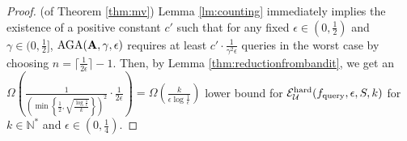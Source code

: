 \begin{proof}(of Theorem \ref{thm:mv})
Lemma \ref{lm:counting} immediately implies the existence of a positive constant $c'$ such that for any fixed $\epsilon\in(0,\frac{1}{2})$ and $\gamma\in(0,\frac{1}{2}]$, ${\mathrm{AGA}}(\mathbf A, \gamma,\epsilon)$ requires at least $c'\cdot\frac{1}{\gamma^2\epsilon}$ queries in the worst case by choosing $n=\lceil\frac{1}{2\epsilon}\rceil-1$. Then, by Lemma \ref{thm:reductionfrombandit}, we get an $\Omega(\frac{1}{
\left(\min\left\{\frac{1}{2},\sqrt{\frac{
	\log\frac{1}{\epsilon}
}{k}}\right\}\right)^2
}\cdot\frac{1}{2\epsilon})=\Omega(\frac{k}{\epsilon\log\frac{1}{\epsilon}})$ lower bound for $\mathcal{E}^{\mathrm{hard}}_{{\mathcal{U}}}(f_{\mathrm{query}},\epsilon,S,k)$ for $k\in\mathbb N^*$ and $\epsilon\in(0,\frac{1}{4})$.
\end{proof}
